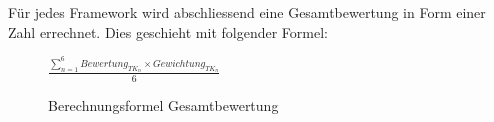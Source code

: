 \newpage



Für jedes Framework wird abschliessend eine Gesamtbewertung in Form einer Zahl errechnet. Dies geschieht mit folgender Formel:

\begin{figure}[H]
	\centering
	\large
	\begin{math}
		\frac{\sum \limits_{n=1}^6 Bewertung_{TK_n} \times {Gewichtung_{TK_n}}}{6}
	\end{math}
	\caption{Berechnungsformel Gesamtbewertung}
\end{figure}

\newpage






